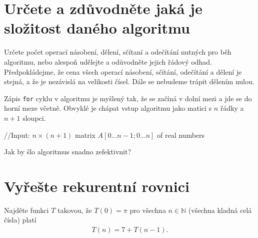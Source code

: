 \documentclass[12pt,oneside]{article}
\begin{document}
	\section{Určete a zdůvodněte jaká je složitost daného algoritmu}
	Určete počet operací násobení, dělení, sčítaní a odečítání nutných pro běh algoritmu, nebo alespoň udělejte a odůvodněte jejich řádový odhad.
	Předpokládejme, že cena všech operací násobení, sčítání, odečítání a dělení je stejná, a že je nezávislá na velikosti čísel.
	Dále se nebudeme trápit dělením nulou.

	Zápis \verb|for| cyklu v algoritmu je myšlený tak, že se začíná v dolní mezi a jde se do horní meze včetně.
	Obvyklé je chápat vstup algoritmu jako matici s $n$ řádky a $n+1$ sloupci.
	\begin{algorithm}[h]
		\caption{What does this do?}
		\DontPrintSemicolon
		//Input: $n\times (n+1)$ matrix $A[0\dots n-1; 0 \dots n]$ of real numbers \;
	\end{algorithm}

	Jak by šlo algoritmus snadno zefektivnit?

	\section{Vyřešte rekurentní rovnici}
	Najděte funkci $T$ takovou, že $T(0) = \pi$ pro všechna $n \in \mathbb{N}$ (všechna kladná celá čísla) platí
	\begin{align}
		T(n) = 7 + T(n-1).
	\end{align}
\end{document}
